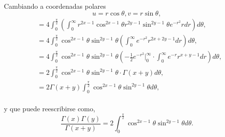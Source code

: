 \documentclass{article}
\begin{document}
\paragraph{} Cambiando a coordenadas polares
$$u = r\cos{\theta}, v = r\sin{\theta},$$
\begin{align*}
&= 4 \int_{0}^{\frac{\pi}{2}}\left(\int_{0}^{\infty}r^{2x-1} \cos^{2x-1}{\theta} r^{2y -1} \sin^{2y-1}{\theta} e^{-r^2} r dr\right)d\theta,\\
&= 4\int_{0}^{\frac{\pi}{2}} \cos^{2x-1}{\theta}\sin^{2y-1}{\theta}\left(\int_{0}^{\infty}e^{-r^2}r^{2x+2y-1} dr\right)d\theta,\\
&= 4 \int_{0}^{\frac{\pi}{2}} \cos^{2x-1}{\theta}\sin^{2y-1}{\theta} \left(-\frac{1}{2} e^{-r^2}\bigg|_0^\infty \cdot \int_{0}^{\infty} e^{-r} r^{x+y-1}dr\right) d\theta,\\
&= 2 \int_{0}^{\frac{\pi}{2}} \cos^{2x-1}{\theta} \sin^{2y-1}{\theta} \cdot \Gamma(x+y) d\theta,\\
&= 2 \Gamma(x+y) \int_{0}^{\frac{\pi}{2}} \cos^{2x-1}{\theta}\sin^{2y-1}{\theta} d\theta,
\end{align*}
\paragraph{}y que puede reescribirse como,
$$\frac{\Gamma(x) \Gamma(y)}{\Gamma(x+y)} = 2 \int_{0}^{\frac{\pi}{2}} \cos^{2x-1}{\theta} \sin^{2y-1}{\theta} d\theta.$$
\nocite{*}


\end{document}
